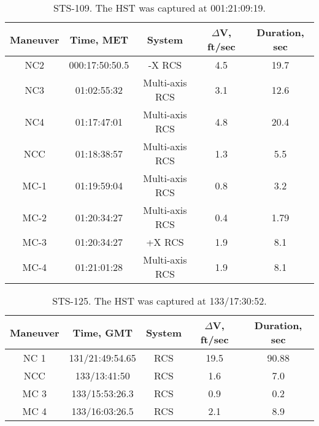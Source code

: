 \documentclass[onecolumn,10pt]{jhwhw}
\begin{document}
\begin{table}[h]
\begin{center}
\begin{tabular}{|c |c |c |c |c|}
\hline
Maneuver & Time, MET & System & $\Delta$V, ft/sec & Duration, sec \\
\hline
NC2  & 000:17:50:50.5 & -X RCS & 4.5 & 19.7 \\ \hline
NC3  & 01:02:55:32    & Multi-axis RCS & 3.1 & 12.6 \\ \hline
NC4  & 01:17:47:01    & Multi-axis RCS & 4.8 & 20.4 \\ \hline
NCC  & 01:18:38:57    & Multi-axis RCS & 1.3 & 5.5 \\ \hline
MC-1 & 01:19:59:04    & Multi-axis RCS & 0.8 & 3.2 \\ \hline
MC-2 & 01:20:34:27    & Multi-axis RCS & 0.4 & 1.79 \\ \hline
MC-3 & 01:20:34:27    & +X RCS & 1.9 & 8.1 \\ \hline
MC-4 & 01:21:01:28    & Multi-axis RCS & 1.9 & 8.1 \\ \hline
\end{tabular}
\end{center}
\caption{STS-109. The HST was captured at 001:21:09:19.}
\end{table}


\begin{table}[h]
\begin{center}
\begin{tabular}{|c |c |c |c |c|}
\hline
Maneuver & Time, GMT & System & $\Delta$V, ft/sec & Duration, sec \\
\hline
NC 1 & 131/21:49:54.65 & RCS & 19.5 & 90.88   \\ \hline
NCC  & 133/13:41:50    & RCS &  1.6 & 7.0     \\ \hline
MC 3 & 133/15:53:26.3  & RCS &  0.9 & 0.2     \\ \hline
MC 4 & 133/16:03:26.5  & RCS &  2.1 & 8.9     \\ \hline
\end{tabular}
\end{center}
\caption{STS-125. The HST was captured at 133/17:30:52.}
\end{table}


{}
\end{document}
